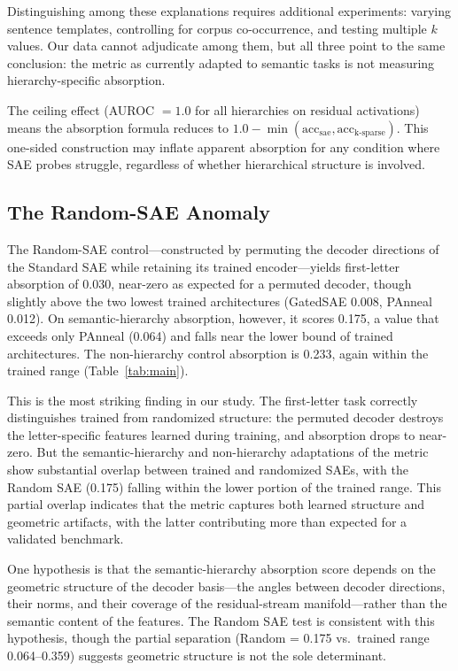 \documentclass{article}
\begin{document}
Distinguishing among these explanations requires additional experiments: varying sentence templates, controlling for corpus co-occurrence, and testing multiple $k$ values. Our data cannot adjudicate among them, but all three point to the same conclusion: the metric as currently adapted to semantic tasks is not measuring hierarchy-specific absorption.

The ceiling effect (AUROC $= 1.0$ for all hierarchies on residual activations) means the absorption formula reduces to $1.0 - \min(\text{acc}_{\text{sae}}, \text{acc}_{\text{k-sparse}})$. This one-sided construction may inflate apparent absorption for any condition where SAE probes struggle, regardless of whether hierarchical structure is involved.

\subsection{The Random-SAE Anomaly}

The Random-SAE control---constructed by permuting the decoder directions of the Standard SAE while retaining its trained encoder---yields first-letter absorption of 0.030, near-zero as expected for a permuted decoder, though slightly above the two lowest trained architectures (GatedSAE 0.008, PAnneal 0.012). On semantic-hierarchy absorption, however, it scores 0.175, a value that exceeds only PAnneal (0.064) and falls near the lower bound of trained architectures. The non-hierarchy control absorption is 0.233, again within the trained range (Table~\ref{tab:main}).

This is the most striking finding in our study. The first-letter task correctly distinguishes trained from randomized structure: the permuted decoder destroys the letter-specific features learned during training, and absorption drops to near-zero. But the semantic-hierarchy and non-hierarchy adaptations of the metric show substantial overlap between trained and randomized SAEs, with the Random SAE (0.175) falling within the lower portion of the trained range. This partial overlap indicates that the metric captures both learned structure and geometric artifacts, with the latter contributing more than expected for a validated benchmark.

One hypothesis is that the semantic-hierarchy absorption score depends on the geometric structure of the decoder basis---the angles between decoder directions, their norms, and their coverage of the residual-stream manifold---rather than the semantic content of the features. The Random SAE test is consistent with this hypothesis, though the partial separation (Random = 0.175 vs.~trained range 0.064--0.359) suggests geometric structure is not the sole determinant.
\end{document}
